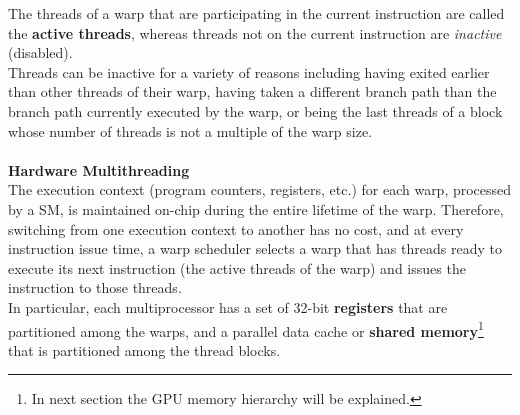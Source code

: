 
	The threads of a warp that are participating in the current instruction are called the \textbf{active threads}, whereas threads not on the current instruction are \textit{inactive} (disabled).\\
	Threads can be inactive for a variety of reasons including having exited earlier than other threads of their warp, having taken a different branch path than the branch path currently executed by the warp, or being the last threads of a block whose number of threads is not a multiple of the warp size\cite{cudaguide}.\\\\
	\textbf{\large{Hardware Multithreading}}\\	
	The execution context (program counters, registers, etc.) for each warp, processed by a SM, is maintained on-chip during the entire lifetime of the warp. Therefore, switching from one execution context to another has no cost, and at every instruction issue time, a warp scheduler selects a warp that has threads ready to execute its next instruction (the active threads of the warp) and issues the instruction to those threads.\\	
	In particular, each multiprocessor has a set of 32-bit \textbf{registers} that are partitioned among the warps, and a parallel data cache or \textbf{shared memory}\footnote{In next section the GPU memory hierarchy will be explained.} that is partitioned among the thread blocks.
	
